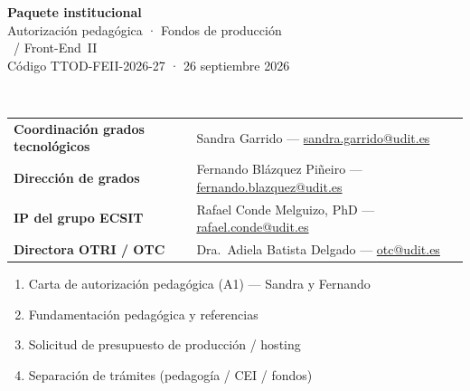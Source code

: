 \documentclass[11pt,a4paper]{scrartcl}
\begin{document}
\LogoRow
\begin{center}
  {\LARGE\sffamily\bfseries Paquete institucional}\\[0.35em]
  {\large\sffamily Autorización pedagógica · Fondos de producción}\\[0.5em]
  {\normalsize\color{uditnavy} \TTODfull\ / Front-End~II}\\[0.35em]
  {\small Código TTOD-FEII-2026-27 · 26 septiembre 2026}
\end{center}

\vspace{0.5em}
\\[0.25em]
\noindent
\begin{tabularx}{\textwidth}{@{}>{\raggedright\arraybackslash}p{4.6cm}X@{}}
  \textbf{Coordinación grados tecnológicos} &
    Sandra Garrido ---
    \href{mailto:sandra.garrido@udit.es}{sandra.garrido@udit.es}\\[0.15em]
  \textbf{Dirección de grados} &
    Fernando Blázquez Piñeiro ---
    \href{mailto:fernando.blazquez@udit.es}{fernando.blazquez@udit.es}\\[0.15em]
  \textbf{IP del grupo ECSIT} &
    Rafael Conde Melguizo, PhD ---
    \href{mailto:rafael.conde@udit.es}{rafael.conde@udit.es}\\[0.15em]
  \textbf{Directora OTRI / OTC} &
    Dra.\ Adiela Batista Delgado ---
    \href{mailto:otc@udit.es}{otc@udit.es}
\end{tabularx}

\vspace{0.45em}

\vspace{0.4em}
\begin{enumerate}
  \item Carta de autorización pedagógica (A1) --- Sandra y Fernando
  \item Fundamentación pedagógica y referencias
  \item Solicitud de presupuesto de producción / hosting
  \item Separación de trámites (pedagogía / CEI / fondos)
\end{enumerate}
\end{document}
